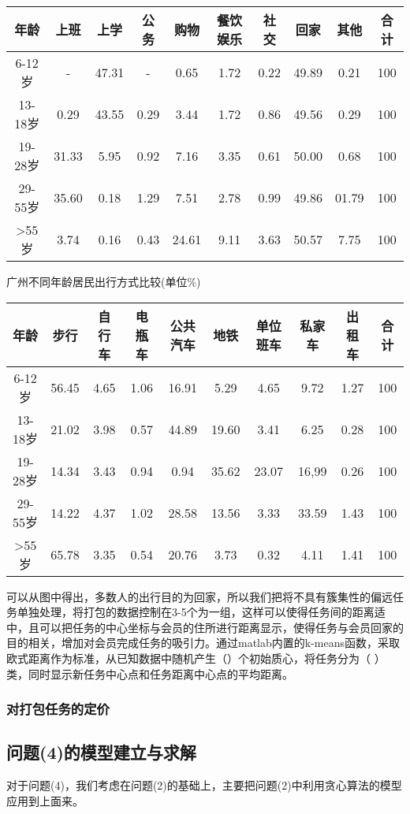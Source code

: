 \documentclass{ctexart}
\begin{document}
\begin{tabular}{|cccccccccc|}

\hline
年龄 &上班&上学&公务&购物&餐饮娱乐&社交&回家&其他&合计\\
\hline
6-12岁 &-&47.31&-&0.65&1.72&0.22&49.89&0.21&100\\
\hline
13-18岁 &0.29&43.55&0.29&3.44&1.72&0.86&49.56&0.29&100\\
\hline
19-28岁 &31.33&5.95&0.92&7.16&3.35&0.61&50.00&0.68&100\\
\hline
29-55岁 &35.60&0.18&1.29&7.51&2.78&0.99&49.86&01.79&100\\
\hline
>55岁 &3.74&0.16&0.43&24.61&9.11&3.63&50.57&7.75&100\\
\hline
\end{tabular}

\centerline{广州不同年龄居民出行方式比较(单位\%)}

\begin{tabular}{|cccccccccc|}

\hline
年龄 &步行&自行车&电瓶车&公共汽车&地铁&单位班车&私家车&出租车&合计\\
\hline
6-12岁 &56.45&4.65&1.06&16.91&5.29&4.65&9.72&1.27&100\\
\hline
13-18岁 &21.02&3.98&0.57&44.89&19.60&3.41&6.25&0.28&100\\
\hline
19-28岁 &14.34&3.43&0.94&0.94&35.62&23.07&16,99&0.26&100\\
\hline
29-55岁 &14.22&4.37&1.02&28.58&13.56&3.33&33.59&1.43&100\\
\hline
>55岁 &65.78&3.35&0.54&20.76&3.73&0.32&4.11&1.41&100\\
\hline
\end{tabular}
可以从图中得出，多数人的出行目的为回家，所以我们把将不具有簇集性的偏远任务单独处理，将打包的数据控制在3-5个为一组，这样可以使得任务间的距离适中，且可以把任务的中心坐标与会员的住所进行距离显示，使得任务与会员回家的目的相关，增加对会员完成任务的吸引力。通过matlab内置的k-means函数，采取欧式距离作为标准，从已知数据中随机产生（）个初始质心，将任务分为（ ）类，同时显示新任务中心点和任务距离中心点的平均距离。
\subsubsection{对打包任务的定价}
\subsection{问题(4)的模型建立与求解}
对于问题(4)，我们考虑在问题(2)的基础上，主要把问题(2)中利用贪心算法的模型应用到上面来。
\end{document}
